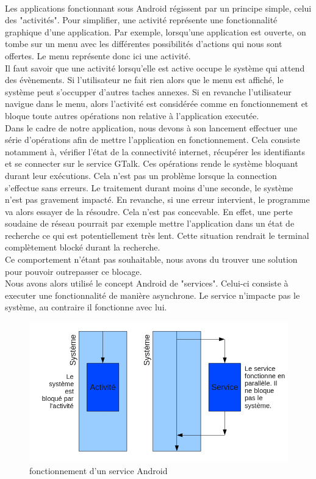 \paragraph{}
Les applications fonctionnant sous Android régissent par un principe simple, celui des "activités".
Pour simplifier, une activité représente une fonctionnalité graphique d'une application. Par exemple,
lorsqu'une application est ouverte, on tombe sur un menu avec les différentes possibilités d'actions 
qui nous sont offertes. Le menu représente donc ici une activité. 
\\
Il faut savoir que une activité lorsqu'elle est active occupe le système qui attend des évènements.
Si l'utilisateur ne fait rien alors que le menu est affiché, le système peut s'occupper d'autres 
taches annexes. Si en revanche l'utilisateur navigue dans le menu, alors l'activité est considérée
comme en fonctionnement et bloque toute autres opérations non relative à l'application executée.
\\
Dans le cadre de notre application, nous devons à son lancement effectuer une série d'opérations 
afin de mettre l'application en fonctionnement. Cela consiste notamment à, vérifier l'état de la 
connectivité internet, récupérer les identifiants et se connecter sur le service GTalk. Ces 
opérations rende le système bloquant durant leur exécutions. Cela n'est pas un problème lorsque la 
connection s'effectue sans erreurs. Le traitement durant moins d'une seconde, le système n'est pas
gravement impacté. En revanche, si une erreur intervient, le programme va alors essayer de la résoudre.
Cela n'est pas concevable. En effet, une perte soudaine de réseau pourrait par exemple mettre 
l'application dans un état de recherche ce qui est potentiellement très lent. Cette situation rendrait
le terminal complètement blocké durant la recherche. 
\\
Ce comportement n'étant pas souhaitable, nous avons du trouver une solution pour pouvoir outrepasser ce blocage.
\\
Nous avons alors utilisé le concept Android de "services". Celui-ci consiste à executer une fonctionnalité 
de manière asynchrone. Le service n'impacte pas le système, au contraire il fonctionne avec lui. 

\begin{figure}[!h]
	\center
	\includegraphics[width=15cm]{img/fonctionnement-des-services-android.png}
	\caption{fonctionnement d'un service Android}
\end{figure}

